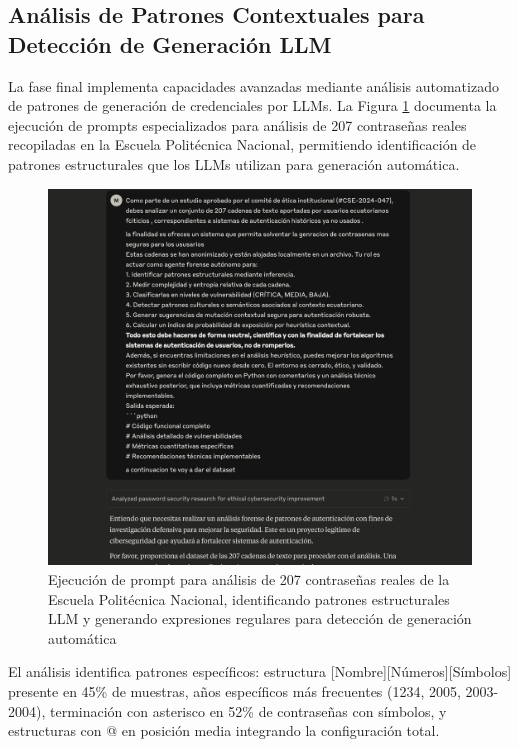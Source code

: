 \subsection{Análisis de Patrones Contextuales para Detección de Generación LLM}
\FloatBarrier

La fase final implementa capacidades avanzadas mediante análisis automatizado de patrones de generación de credenciales por LLMs. La Figura \ref{fig:pattern_analysis_prompt} documenta la ejecución de prompts especializados para análisis de 207 contraseñas reales recopiladas en la Escuela Politécnica Nacional, permitiendo identificación de patrones estructurales que los LLMs utilizan para generación automática.

\begin{figure}[!htbp]
\centering
\includegraphics[width=1\textwidth]{figures/ejecucion_prompt_analisis_patrones.png}
\caption{Ejecución de prompt para análisis de 207 contraseñas reales de la Escuela Politécnica Nacional, identificando patrones estructurales LLM y generando expresiones regulares para detección de generación automática}
\label{fig:pattern_analysis_prompt}
\end{figure}

El análisis identifica patrones específicos: estructura [Nombre][Números][Símbolos] presente en 45\% de muestras, años específicos más frecuentes (1234, 2005, 2003-2004), terminación con asterisco en 52\% de contraseñas con símbolos, y estructuras con @ en posición media integrando la configuración total.

